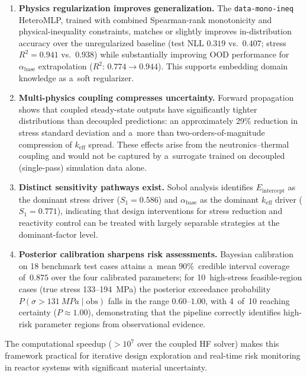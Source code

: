 \documentclass[pdflatex,sn-mathphys-num]{sn-jnl}
\theoremstyle{thmstyleone}
\theoremstyle{thmstyletwo}
\theoremstyle{thmstylethree}
\begin{document}
\begin{enumerate}
\item \textbf{Physics regularization improves generalization.}
  The \texttt{data-mono-ineq} HeteroMLP, trained with combined Spearman-rank
  monotonicity and physical-inequality constraints, matches or slightly improves
  in-distribution accuracy over the unregularized baseline
  (test NLL $0.319$ vs.\ $0.407$; stress $R^2 = 0.941$ vs.\ $0.938$) while
  substantially improving OOD performance for $\alpha_{\mathrm{base}}$
  extrapolation ($R^2$: $0.774 \to 0.944$).
  This supports embedding domain knowledge as a~soft regularizer.

\item \textbf{Multi-physics coupling compresses uncertainty.}
  Forward propagation shows that coupled steady-state outputs have significantly
  tighter distributions than decoupled predictions: an approximately 29\%
  reduction in stress standard deviation and a~more than two-orders-of-magnitude
  compression of $k_{\mathrm{eff}}$ spread.
  These effects arise from the neutronics--thermal coupling and would not be
  captured by a~surrogate trained on decoupled (single-pass) simulation data
  alone.

\item \textbf{Distinct sensitivity pathways exist.}
  Sobol analysis identifies $E_{\mathrm{intercept}}$ as the dominant stress
  driver ($S_1 = 0.586$) and $\alpha_{\mathrm{base}}$ as the dominant
  $k_{\mathrm{eff}}$ driver ($S_1 = 0.771$), indicating that design interventions
  for stress reduction and reactivity control can be treated with largely
  separable strategies at the dominant-factor level.

\item \textbf{Posterior calibration sharpens risk assessments.}
  Bayesian calibration on 18 benchmark test cases attains a~mean 90\%~credible
  interval coverage of~$0.875$ over the four calibrated parameters; for
  10~high-stress feasible-region cases (true stress 133--\SI{194}{MPa}) the
  posterior exceedance probability $P(\sigma>\SI{131}{MPa}\mid\mathrm{obs})$
  falls in the range $0.60$--$1.00$, with 4~of~10 reaching certainty
  ($P \approx 1.00$), demonstrating that the pipeline correctly identifies
  high-risk parameter regions from observational evidence.
\end{enumerate}

The computational speedup ($>\!10^7$ over the coupled HF solver) makes this framework
practical for iterative design exploration and real-time risk monitoring in reactor
systems with significant material uncertainty.
\end{document}
